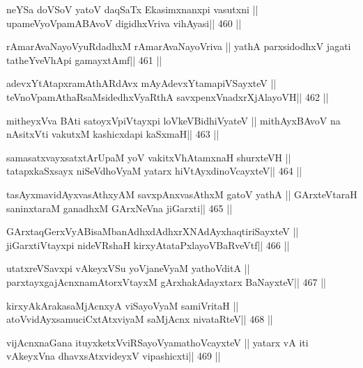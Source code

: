 \begin{shl}
neYSa doVSoV yatoV daqSaTx Ekasimxnanxpi vasutxni ||
upameVyoVpamABAvoV digidhxVriva vihAyasi\hfill || 460 ||
\end{shl}

\begin{shl}
rAmarAvaNayoVyuRdadhxM rAmarAvaNayoVriva ||
yathA parxsidodhxV jagati tatheYveVhApi gamayxtAmf\hfill || 461 ||
\end{shl}

\begin{shl}
adevxYtAtapxramAthARdAvx mAyAdevxYtamapiVSayxteV ||
teVnoVpamAthaRsaMsidedhxVyaRthA savxpenxVnadxrXjAlayoVH\hfill || 462 ||
\end{shl}

\begin{shl}
mitheyxVva BAti satoyxV\s piVtayxpi loVkeV\s BidhiVyateV ||
mithAyxBAvoV na nAsitxVti vakutxM kashicxdapi kaSxmaH\hfill || 463 ||
\end{shl}

\begin{shl}
samasatxvayxsatxtArUpaM yoV vakitxVhA\s\s tamxnaH shurxteVH ||
tatapxkaSxsayx niSeVdhoV\s yaM yatarx hiVtAyxdinoVcayxteV\hfill || 464 ||
\end{shl}

\begin{shl}
tasAyxmavidAyxvasAthxyAM savxpAnxvasAthxM gatoV yathA ||
GArxteVtaraH saninxtaraM ganadhxM GArxNeVna jiGarxti\hfill || 465 ||
\end{shl}

\begin{shl}
GArxtaqGerxVyABisaMbanAdhxdAdhxrXNAdAyxhaqtiriSayxteV ||
jiGarxtiVtayxpi nideVRshaH kirxyAtataPxlayoVBaRveVtf\hfill || 466 ||
\end{shl}

\begin{shl}
utatxreVSavxpi vAkeyxVSu yoVjaneVyaM yathoVditA ||
parxtayxgajAcnxnamAtorxVtayxM gArxhakAdayxtarx BaNayxteV\hfill || 467 ||
\end{shl}

\begin{shl}
kirxyAkArakasaMjAcnxyA viSayoV\s yaM samiVritaH ||
atoV\s vidAyxsamuciCxtAtxviyaM saMjAcnx nivataRteV\hfill || 468 ||
\end{shl}

\begin{shl}
vijAcnxnaGana ituyxketxVviRSayoV\s yamathoVcayxteV ||
yatarx vA iti vAkeyxVna dhavxsAtxvideyxV vipashicxti\hfill || 469 ||
\end{shl}

